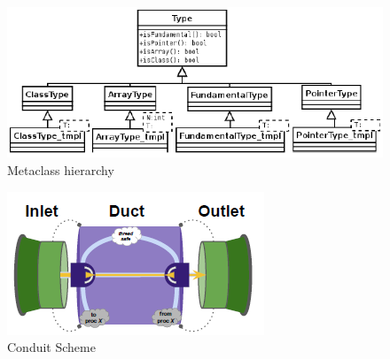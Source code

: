 \documentclass[11pt]{article}
\begin{document}
\begin{figure}
    \centering
    \includegraphics[width=0.5\linewidth]{ClassType.png}
    \caption{Metaclass hierarchy}
    \label{fig:ClassType}
\end{figure}

\begin{figure}
    \centering
    \includegraphics[width=0.5\linewidth]{Conduit.png}
    \caption{Conduit Scheme}
    \label{fig:Conduit}
\end{figure}

\printbibliography
\end{document}
